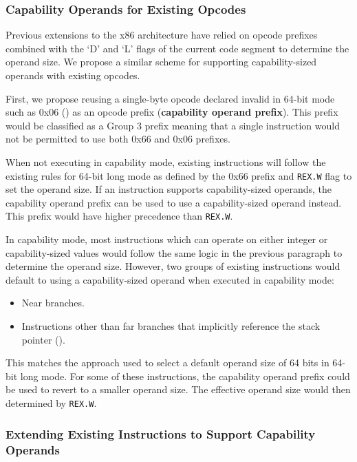 \subsubsection{Capability Operands for Existing Opcodes}

Previous extensions to the x86 architecture have relied on opcode
prefixes combined with the `D' and `L' flags of the current code
segment to determine the operand size.  We propose a similar
scheme for supporting capability-sized operands with existing
opcodes.

First, we propose reusing a single-byte opcode declared invalid in
64-bit mode such as 0x06 () as an opcode prefix
(\textbf{capability operand prefix}).  This prefix would be classified
as a Group 3 prefix meaning that a single instruction would not be
permitted to use both 0x66 and 0x06 prefixes.

When not executing in capability mode, existing instructions will
follow the existing rules for 64-bit long mode as defined by the
0x66 prefix and \texttt{REX.W} flag to set the operand size.  If an
instruction supports capability-sized operands, the capability operand
prefix can be used to use a capability-sized operand instead.  This
prefix would have higher precedence than \texttt{REX.W}.

In capability mode, most instructions which can operate on either
integer or capability-sized values would follow the same logic in the
previous paragraph to determine the operand size.  However, two groups
of existing instructions would default to using a capability-sized
operand when executed in capability mode:

\begin{itemize}
  \item Near branches.

  \item Instructions other than far branches that implicitly reference
    the stack pointer (\CSP{}).
\end{itemize}

This matches the approach used to select a default operand size of 64
bits in 64-bit long mode.  For some of these instructions, the
capability operand prefix could be used to revert to a smaller operand
size.  The effective operand size would then determined by \texttt{REX.W}.

\subsubsection{Extending Existing Instructions to Support Capability Operands}

